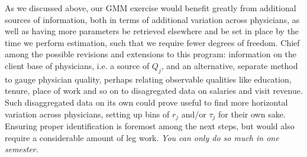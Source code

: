 \documentclass[../main.tex]{subfiles}
\begin{document}
As we discussed above, our GMM exercise would benefit greatly from additional sources of information, both in terms of additional variation across physicians, as well as having more parameters be retrieved elsewhere and be set in place by the time we perform estimation, such that we require fewer degrees of freedom. Chief among the possible revisions and extensions to this program: information on the client base of physicians, i.e. a source of $Q_j$, and an alternative, separate method to gauge physician quality, perhaps relating observable qualities like education, tenure, place of work and so on to disagregated data on salaries and visit revenue. Such disaggregated data on its own could prove useful to find more horizontal variation across physicians, setting up bins of $r_j$ and/or $\tau_j$ for their own sake. Ensuring proper identification is foremost among the next steps, but would also require a considerable amount of leg work. \textit{You can only do so much in one semester.}
\end{document}
